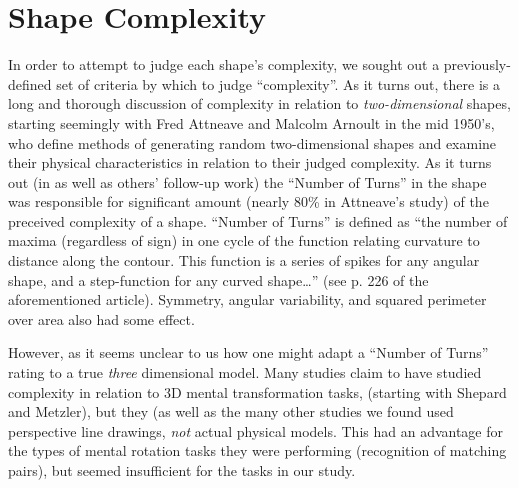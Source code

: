 \section{Shape Complexity}

In order to attempt to judge each shape's complexity, we sought out a
previously-defined set of criteria by which to judge ``complexity''. As it turns
out, there is a long and thorough discussion of complexity in relation to
\emph{two-dimensional} shapes, starting seemingly with Fred Attneave and Malcolm
Arnoult\cite{attneave1956quantitative}\cite{attneave1957physical} in the mid
1950's, who define methods of generating random two-dimensional shapes and
examine their physical characteristics in relation to their judged complexity.
As it turns out (in \cite{attneave1957physical} as well as others' follow-up
work) the ``Number of Turns'' in the shape was responsible for significant
amount (nearly 80\% in Attneave's study) of the preceived complexity of a shape.
``Number of Turns'' is defined as ``the number of maxima (regardless of sign)
in one cycle of the function relating curvature to distance along the contour.
This function is a series of spikes for any angular shape, and a step-function
for any curved shape\ldots'' (see p. 226 of the aforementioned article).
Symmetry, angular variability, and squared perimeter over area also had some
effect.

However, as it seems unclear to us how one might adapt a ``Number of Turns''
rating to a true \emph{three} dimensional model. Many studies claim to have
studied complexity in relation to 3D mental transformation tasks, (starting with
Shepard and Metzler\cite{shepard1971mental}), but they (as well as the many
other studies we
found\cite{metzler1974transformational}\cite{shepard1988mental}\cite{vandenberg1978mental}
used perspective line drawings, \emph{not} actual physical models. This had an
advantage for the types of mental rotation tasks they were performing
(recognition of matching pairs), but seemed insufficient for the tasks in our
study.

